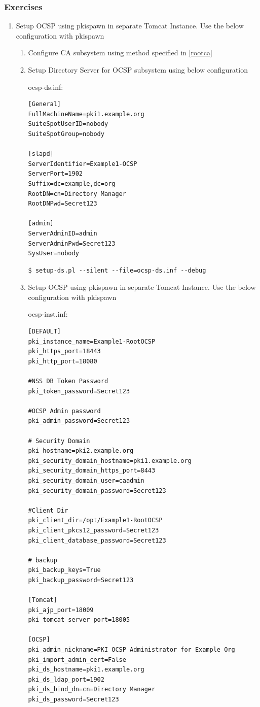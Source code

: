 \documentclass[a4paper]{article}
\begin{document}
\subsubsection{Exercises}
    \begin{enumerate}[label*=\arabic*.]
        \item Setup OCSP using pkispawn in separate Tomcat Instance. Use the below configuration with pkispawn
            \begin{enumerate}[label*=\arabic*.]
                \item Configure CA subsystem using method specified in \ref{rootca}
                \item Setup Directory Server for OCSP subsystem using below configuration 

                ocsp-ds.inf:
                    \begin{lstlisting}[style=configFile]
[General]
FullMachineName=pki1.example.org
SuiteSpotUserID=nobody
SuiteSpotGroup=nobody

[slapd]
ServerIdentifier=Example1-OCSP
ServerPort=1902
Suffix=dc=example,dc=org
RootDN=cn=Directory Manager
RootDNPwd=Secret123

[admin]
ServerAdminID=admin
ServerAdminPwd=Secret123
SysUser=nobody
                    \end{lstlisting}
                    \begin{lstlisting}[style=bashInputStyle]
$ setup-ds.pl --silent --file=ocsp-ds.inf --debug                
                    \end{lstlisting}
                \item \label{ocsp_sep_tomcat} Setup OCSP using pkispawn in separate Tomcat Instance. Use the below configuration with pkispawn

                    ocsp-inst.inf:
                    \begin{lstlisting}[style=configFile]
[DEFAULT]
pki_instance_name=Example1-RootOCSP
pki_https_port=18443
pki_http_port=18080

#NSS DB Token Password
pki_token_password=Secret123

#OCSP Admin password
pki_admin_password=Secret123

# Security Domain
pki_hostname=pki2.example.org
pki_security_domain_hostname=pki1.example.org
pki_security_domain_https_port=8443
pki_security_domain_user=caadmin
pki_security_domain_password=Secret123

#Client Dir
pki_client_dir=/opt/Example1-RootOCSP
pki_client_pkcs12_password=Secret123
pki_client_database_password=Secret123

# backup
pki_backup_keys=True
pki_backup_password=Secret123

[Tomcat]
pki_ajp_port=18009
pki_tomcat_server_port=18005

[OCSP]
pki_admin_nickname=PKI OCSP Administrator for Example Org
pki_import_admin_cert=False
pki_ds_hostname=pki1.example.org
pki_ds_ldap_port=1902
pki_ds_bind_dn=cn=Directory Manager
pki_ds_password=Secret123
                    \end{lstlisting}
            \end{enumerate}
    \end{enumerate}
\end{document}

